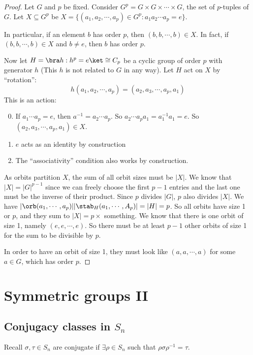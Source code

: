 \documentclass[a4paper]{article}
\begin{document}
  \begin{proof}
    Let $G$ and $p$ be fixed. Consider $G^p = G\times G\times \cdots \times G$, the set of $p$-tuples of $G$. Let $X \subseteq G^p$ be $X = \{(a_1, a_2, \cdots, a_p)\in G^p: a_1a_2\cdots a_p = e\}$.

    In particular, if an element $b$ has order $p$, then $(b, b, \cdots, b)\in X$. In fact, if $(b, b, \cdots, b)\in X$ and $b\not= e$, then $b$ has order $p$.

    Now let $H = \bra h: h^p = e\ket\cong C_p$ be a cyclic group of order $p$ with generator $h$ (This $h$ is not related to $G$ in any way). Let $H$ act on $X$ by ``rotation'':
    \[
      h(a_1, a_2, \cdots, a_p) = (a_2, a_3, \cdots, a_p, a_1)
    \]
    This is an action:
    \begin{enumerate}[label=\arabic{*}.]
        \setcounter{enumi}{-1}
      \item If $a_1\cdots a_p = e$, then $a^{-1} = a_2\cdots a_p$. So $a_2\cdots a_pa_1 = a_1^{-1}a_1 = e$. So $(a_2, a_3, \cdots, a_p, a_1)\in X$.
      \item $e$ acts as an identity by construction
      \item The ``associativity'' condition also works by construction. 
    \end{enumerate}

    As orbits partition $X$, the sum of all orbit sizes must be $|X|$. We know that $|X| = |G|^{p - 1}$ since we can freely choose the first $p - 1$ entries and the last one must be the inverse of their product. Since $p$ divides $|G|$, $p$ also divides $|X|$. We have $|\orb(a_1, \cdots , a_p)||\stab_H(a_1, \cdots, A_p)| = |H| = p$. So all orbits have size 1 or $p$, and they sum to $|X| = p\times$ something. We know that there is one orbit of size 1, namely $(e, e, \cdots, e)$. So there must be at least $p - 1$ other orbits of size 1 for the sum to be divisible by $p$.

    In order to have an orbit of size 1, they must look like ${(a, a, \cdots, a)}$  for some $a\in G$, which has order $p$.
  \end{proof}

  \section{Symmetric groups II}
  \subsection{Conjugacy classes in \texorpdfstring{$S_n$}{Sn}}
  Recall $\sigma, \tau\in S_n$ are conjugate if $\exists \rho\in S_n$ such that $\rho \sigma\rho^{-1} = \tau$.
\end{document}
